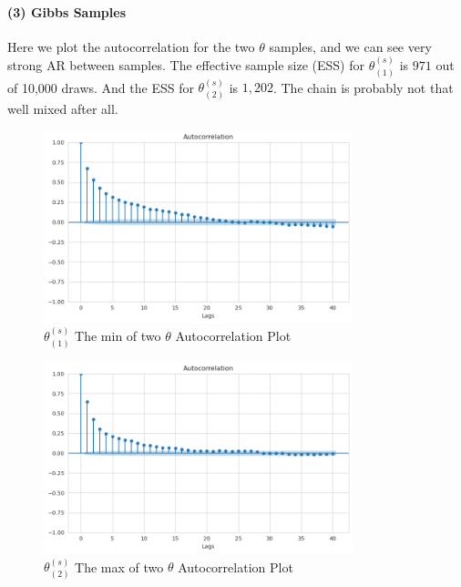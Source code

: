 \documentclass[11pt, letterpaper]{article}
\begin{document}
\paragraph{(3) Gibbs Samples}
Here we plot the autocorrelation for the two $\theta$ samples, and we can see very strong AR between samples. The effective sample size (ESS) for $\theta_{(1)}^{(s)}$ is $971$ out of 10,000 draws. And the ESS for $\theta_{(2)}^{(s)}$ is $1,202$. The chain is probably not that well mixed after all.
\begin{figure}[!h]
  \centering
  \includegraphics[width=0.8\textwidth]{6.2.2(1).png}
  \captionsetup{justification=centering}
  \caption{$\theta_{(1)}^{(s)}$ The min of two $\theta$ Autocorrelation Plot }
\end{figure}

\begin{figure}[!h]
  \centering
  \includegraphics[width=0.8\textwidth]{6.2.2(2).png}
  \captionsetup{justification=centering}
  \caption{$\theta_{(2)}^{(s)}$ The max of two $\theta$ Autocorrelation Plot }
\end{figure}
\end{document}
